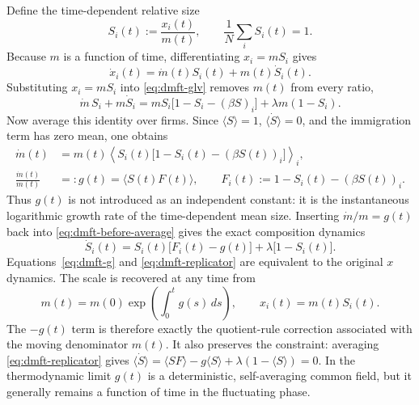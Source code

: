 Define the time-dependent relative size
\begin{equation}
    S_i(t):=\frac{x_i(t)}{m(t)},
    \qquad \frac1N\sum_i S_i(t)=1.
    \label{eq:dmft-relative-size}
\end{equation}
Because $m$ is a function of time, differentiating $x_i=mS_i$ gives
\begin{equation}
    \dot x_i(t)=\dot m(t)S_i(t)+m(t)\dot S_i(t).
    \label{eq:dmft-product-rule}
\end{equation}
Substituting $x_i=mS_i$ into \eqref{eq:dmft-glv} removes $m(t)$ from every ratio,
\begin{equation}
    \dot m\,S_i+m\dot S_i
    =mS_i\bigl[1-S_i-(\beta S)_i\bigr]
     +\lambda m(1-S_i).
    \label{eq:dmft-before-average}
\end{equation}
Now average this identity over firms.  Since $\langle S\rangle=1$, $\langle\dot S\rangle=0$,
and the immigration term has zero mean, one obtains
\begin{align}
    \dot m(t)
      &=m(t)\left\langle S_i(t)
          \bigl[1-S_i(t)-(\beta S(t))_i\bigr]\right\rangle_i,
          \label{eq:dmft-mdot-step}\\
    \frac{\dot m(t)}{m(t)}
      &=:g(t)=\langle S(t)F(t)\rangle,
    \qquad F_i(t):=1-S_i(t)-(\beta S(t))_i.
    \label{eq:dmft-g}
\end{align}
Thus $g(t)$ is not introduced as an independent constant: it is the instantaneous logarithmic
growth rate of the time-dependent mean size.  Inserting $\dot m/m=g(t)$ back into
\eqref{eq:dmft-before-average} gives the exact composition dynamics
\begin{equation}
    \boxed{\;
    \dot S_i(t)=S_i(t)\bigl[F_i(t)-g(t)\bigr]
                  +\lambda\bigl[1-S_i(t)\bigr].
    \;}
    \label{eq:dmft-replicator}
\end{equation}
Equations~\eqref{eq:dmft-g} and \eqref{eq:dmft-replicator} are equivalent to the original
$x$ dynamics.  The scale is recovered at any time from
\begin{equation}
    m(t)=m(0)\exp\left(\int_0^t g(s)\,ds\right),
    \qquad x_i(t)=m(t)S_i(t).
    \label{eq:dmft-reconstruct-scale}
\end{equation}
The $-g(t)$ term is therefore exactly the quotient-rule correction associated with the moving
denominator $m(t)$.  It also preserves the constraint: averaging
\eqref{eq:dmft-replicator} gives $\langle\dot S\rangle=\langle SF\rangle-g\langle S\rangle
+\lambda(1-\langle S\rangle)=0$.  In the thermodynamic limit $g(t)$ is a deterministic,
self-averaging common field, but it generally remains a function of time in the fluctuating phase.

